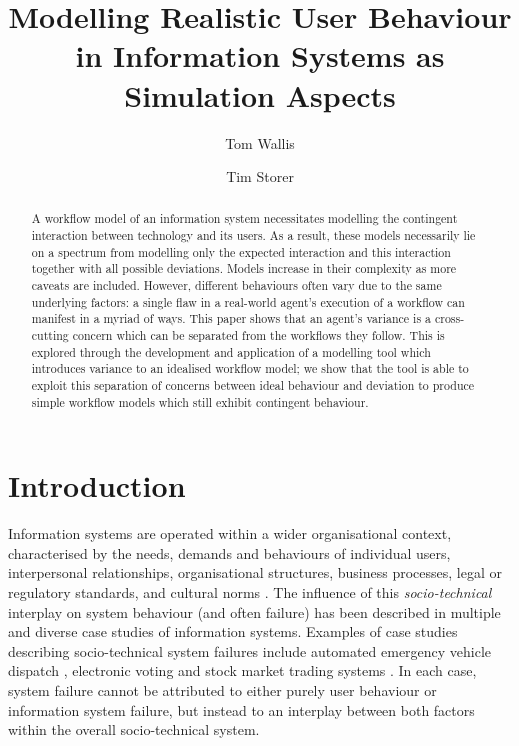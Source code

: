 \documentclass{llncs}
\title{Modelling Realistic User Behaviour in Information Systems as Simulation Aspects}
\author{Tom Wallis\orcidID{} \and Tim Storer\orcidID{}}
\institute{University of Glasgow, Glasgow, Scotland,\\
  \email{w.wallis.1@research.gla.ac.uk},\\
  \email{timothy.storer@glasgow.ac.uk},
}
\begin{document}

\maketitle


\begin{abstract}
A workflow model of an information system necessitates modelling the contingent interaction between technology and its 
users. As a result, these models necessarily lie on a spectrum from modelling only the expected interaction and 
this interaction together with all possible deviations. Models increase in their complexity as more caveats are 
included.
However, different behaviours often vary due to the same underlying factors: a single flaw in a real-world agent's 
execution of a workflow can manifest in a myriad of ways. This paper shows that an agent's variance is a cross-cutting
concern which can be separated from the workflows they follow. This is explored through the development and application
of a modelling tool which introduces variance to an idealised workflow model; we show that the tool is able to exploit 
this separation of concerns between ideal behaviour and deviation to produce simple workflow models which still exhibit 
contingent behaviour.
\end{abstract}


\section{Introduction}
\label{sec:introduction}


Information systems are operated within a wider organisational context, characterised by the needs, demands and
behaviours of individual users, interpersonal relationships, organisational structures, business processes, legal or
regulatory standards, and cultural norms \citep{bade07structures,pentland05organisational}.  The
influence of this \emph{socio-technical} interplay on system behaviour (and often failure) has been described in
multiple and diverse case studies of information systems.  Examples of case studies describing socio-technical system
failures include automated emergency vehicle dispatch \citep{robinson96limited}, electronic voting
\citep{lock07observations} and stock market trading systems \citep{cftc-sec10findings}. In each case, system failure
cannot be attributed to either purely user behaviour or information system failure, but instead to an interplay between
both factors within the overall socio-technical system.
\end{document}
